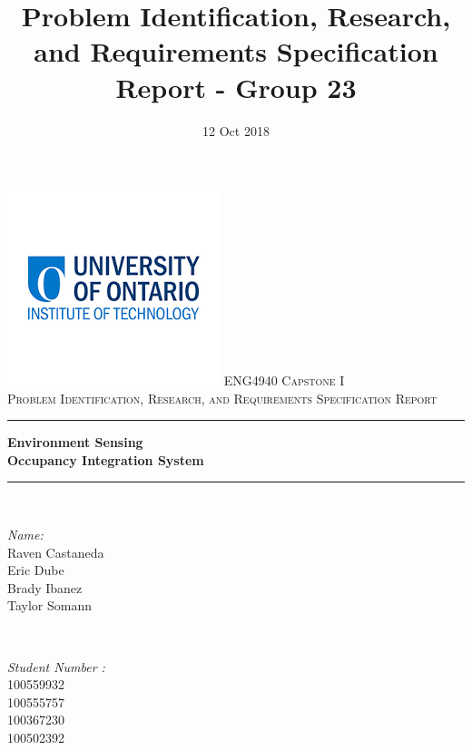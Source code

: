 \documentclass{article}
\title{Problem Identification, Research, and Requirements Specification Report - Group 23}
\author{}
\date{12 Oct 2018}
\begin{document}

\begin{titlepage}
    \centering
    \includegraphics[scale = 1.48]{UOIT.png}
    \textsc{\LARGE ENG4940 Capstone I \\ Problem Identification, Research, and Requirements Specification Report}
	\rule{\linewidth}{0.2 mm}
	{ \huge \bfseries
	   Environment Sensing\\ Occupancy Integration System\newline}
	\rule{\linewidth}{0.2 mm} \\[1.5 cm]
    
    
    
    \begin{minipage}{0.4\textwidth}
		\begin{flushleft} \large
			\emph{Name:}\\
			Raven Castaneda\\
			Eric Dube\\
			Brady Ibanez\\
            Taylor Somann\\
        
			\end{flushleft}
			\end{minipage}~
			\begin{minipage}{0.4\textwidth}
            
			\begin{flushright} \large
			\emph{Student  Number :} \\
			100559932\\
            100555757\\
            100367230\\
            100502392\\
		\end{flushright}
        
	\end{minipage}\\[2 cm]
    
\end{titlepage}
\tableofcontents
\pagebreak
\listoftables
\pagebreak
\listoffigures
\pagebreak
\printglossary[type=\acronymtype,title={List of Abbreviations}]
\pagebreak
\end{document}
